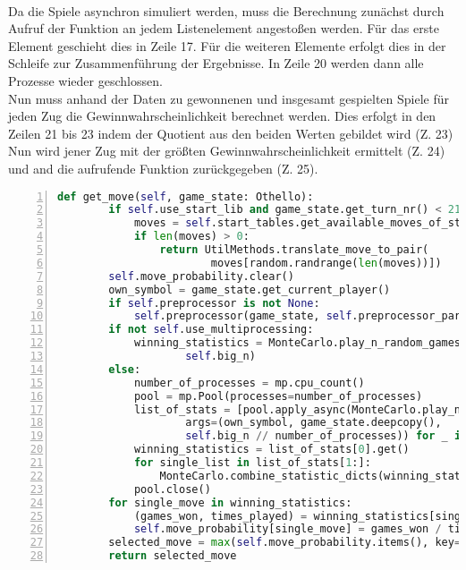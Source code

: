 \\Da die Spiele asynchron simuliert werden, muss die Berechnung zunächst durch Aufruf der Funktion  an jedem Listenelement angestoßen werden. Für das erste Element geschieht dies in Zeile 17. Für die weiteren Elemente erfolgt dies in der Schleife zur Zusammenführung der Ergebnisse. In Zeile 20 werden dann alle Prozesse wieder geschlossen.
\\Nun muss anhand der Daten zu gewonnenen und insgesamt gespielten Spiele für jeden Zug die Gewinnwahrscheinlichkeit berechnet werden. Dies erfolgt in den Zeilen 21 bis 23 indem der Quotient aus den beiden Werten gebildet wird (Z. 23)
 \\Nun wird jener Zug mit der größten Gewinnwahrscheinlichkeit ermittelt (Z. 24) und and die aufrufende Funktion zurückgegeben (Z. 25).      
 \newpage
\begin{lstlisting}[basicstyle=\footnotesize,caption = {get\_move Funktion des \mc\ Agenten}, language = python, captionpos = t , numbers=left, label={lst:ab1}]
    def get_move(self, game_state: Othello):
        if self.use_start_lib and game_state.get_turn_nr() < 21: 
            moves = self.start_tables.get_available_moves_of_start_tables(game_state)
            if len(moves) > 0:
                return UtilMethods.translate_move_to_pair(
                		moves[random.randrange(len(moves))])
        self.move_probability.clear()
        own_symbol = game_state.get_current_player()
        if self.preprocessor is not None:
            self.preprocessor(game_state, self.preprocessor_parameter, self.heuristic)
        if not self.use_multiprocessing:
            winning_statistics = MonteCarlo.play_n_random_games(own_symbol, game_state, 
            		self.big_n)
        else:
            number_of_processes = mp.cpu_count()
            pool = mp.Pool(processes=number_of_processes)
            list_of_stats = [pool.apply_async(MonteCarlo.play_n_random_games, 
            		args=(own_symbol, game_state.deepcopy(), 
            		self.big_n // number_of_processes)) for _ in range(number_of_processes)]
            winning_statistics = list_of_stats[0].get()
            for single_list in list_of_stats[1:]:
                MonteCarlo.combine_statistic_dicts(winning_statistics, single_list.get())
            pool.close()
        for single_move in winning_statistics:
            (games_won, times_played) = winning_statistics[single_move]
            self.move_probability[single_move] = games_won / times_played
        selected_move = max(self.move_probability.items(), key=operator.itemgetter(1))[0]
        return selected_move
\end{lstlisting}


